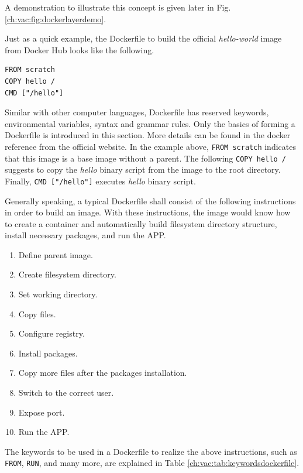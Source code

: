 A demonstration to illustrate this concept is given later in Fig. \ref{ch:vac:fig:dockerlayerdemo}.


Just as a quick example, the Dockerfile to build the official \textit{hello-world} image from Docker Hub looks like the following.
\begin{lstlisting}
FROM scratch
COPY hello /
CMD ["/hello"]
\end{lstlisting}
Similar with other computer languages, Dockerfile has reserved keywords, environmental variables, syntax and grammar rules. Only the basics of forming a Dockerfile is introduced in this section. More details can be found in the docker reference from the official website. In the example above, \verb|FROM scratch| indicates that this image is a base image without a parent. The following \verb|COPY hello /| suggests to copy the \textit{hello} binary script from the image to the root directory. Finally, \verb|CMD ["/hello"]| executes \textit{hello} binary script.

Generally speaking, a typical Dockerfile shall consist of the following instructions in order to build an image. With these instructions, the image would know how to create a container and automatically build filesystem directory structure, install necessary packages, and run the APP.
\begin{enumerate}[(1)]
  \item Define parent image.
  \item Create filesystem directory.
  \item Set working directory.
  \item Copy files.
  \item Configure registry.
  \item Install packages.
  \item Copy more files after the packages installation.
  \item Switch to the correct user.
  \item Expose port.
  \item Run the APP.
\end{enumerate}

The keywords to be used in a Dockerfile to realize the above instructions, such as \verb|FROM|, \verb|RUN|, and many more, are explained in Table \ref{ch:vac:tab:keywordsdockerfile}.

